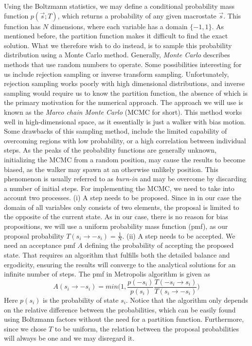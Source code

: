 \documentclass[english,notitlepage,reprint,nofootinbib]{revtex4-1}  %
\begin{document}
Using the Boltzmann statistics, we may define a conditional probability mass function $p(\vec{s}; T)$, which returns a probability of any given macrostate $\vec{s}$. This function has $N$ dimensions, where each variable has a domain $\{-1,1\}$. As mentioned before, the partition function makes it difficult to find the exact solution. What we therefore wish to do instead, is to sample this probability distribution using a Monte Carlo method.
Generally, \textit{Monte Carlo} describes methods that use random numbers to operate. Some possibilities interesting for us include rejection sampling or inverse transform sampling. Unfortunately, rejection sampling works poorly with high dimensional distributions, and inverse sampling would require us to know the partition function, the absence of which is the primary motivation for the numerical approach.
The approach we will use is known as the \textit{Marco chain Monte Carlo} (MCMC for short). This method works well in high-dimensional space, as it essentially is just a walker with bias motion. Some drawbacks of this sampling method, include the limited capability of overcoming regions with low probability, or a high correlation between individual steps. 
As the peaks of the probability functions are generally unknown, initializing the MCMC from a random position, may cause the results to become biased, as the walker may spawn at an otherwise unlikely position. This phenomenon is usually referred to as \textit{burn-in} and may be overcome by discarding a number of initial steps.
For implementing the MCMC, we need to take into account two processes. 
(i) A step needs to be proposed. Since in in our case the domain of all variables only consists of two elements, the proposal is limited to the opposite of the current state. As in our case, there is no reason for bias propositions, we will use a uniform probability mass function (pmf), as our proposal probability $T(s_i \rightarrow -s_i) = \frac{1}{N}$. 
(ii) A step needs to be accepted. We need an acceptance pmf $A$ defining the probability of accepting the proposed state. That requires an algorithm that fulfills both the detailed balance and ergodicity, ensuring the results will converge to the analytical solutions for an infinite number of steps. The pmf in Metropolis algorithm is given as
\begin{equation}
    A(s_i \rightarrow -s_i) = min \Big( 1, \frac{p(-s_i)}{p(s_i)} \frac{T(-s_i \rightarrow s_i)}{T(s_i \rightarrow -s_i)} \Big)
\end{equation}
Here $p(s_i)$ is the probability of state $s_i$. Notice that the algorithm only depends on the relative difference between the probabilities, which can be easily found using Boltzmann factors without the need for a partition function. Furthermore, since we chose $T$ to be uniform, the relation between the proposal probabilities will always be one and we may disregard it. 
\end{document}
